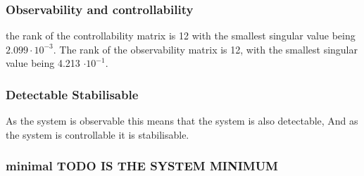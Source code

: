 \subsubsection{Observability and controllability} 
the rank of the controllability matrix is 12 with the smallest singular value being $2.099 \cdot 10^{-3}$. The rank of the observability matrix is 12, with the smallest singular value being 4.213 $\cdot 10^{-1}$.

\subsubsection{Detectable Stabilisable}
As the system is observable this means that the system is also detectable, And as the system is controllable it is stabilisable. 

\subsubsection{minimal TODO IS THE SYSTEM MINIMUM}